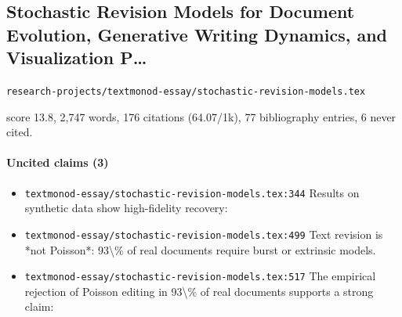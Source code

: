 \documentclass[11pt]{article}
\newcommand{\loc}[1]{{\small\color{muted}\texttt{#1}}}
\begin{document}
\subsection{Stochastic Revision Models for Document Evolution, Generative Writing Dynamics, and Visualization P\ldots{}}
\loc{research-projects/\allowbreak{}textmonod-essay/\allowbreak{}stochastic-revision-models.tex}\par
score 13.8, 2,747 words, 176 citations (64.07/1k), 77 bibliography entries, 6 never cited.

\paragraph{Uncited claims (3)}
\begin{itemize}
\item \loc{textmonod-essay/\allowbreak{}stochastic-revision-models.tex:344} Results on synthetic data show high-fidelity recovery:
\item \loc{textmonod-essay/\allowbreak{}stochastic-revision-models.tex:499} Text revision is *not Poisson*: 93\textbackslash{}\% of real documents require burst or extrinsic models.
\item \loc{textmonod-essay/\allowbreak{}stochastic-revision-models.tex:517} The empirical rejection of Poisson editing in 93\textbackslash{}\% of real documents supports a strong claim:
\end{itemize}
\end{document}

